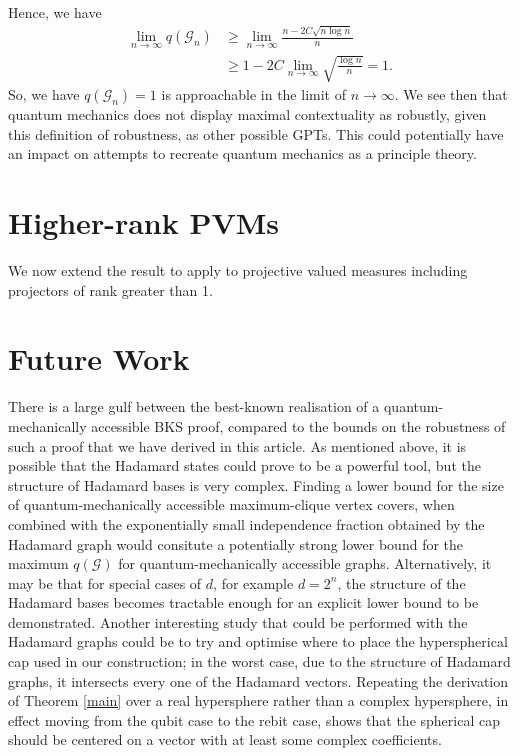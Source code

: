 \documentclass{amsart}
\theoremstyle{definition}
\begin{document}
Hence, we have
\begin{align}
\lim_{n\rightarrow\infty}q(\mathcal{G}_n)&\geq\lim_{n\rightarrow\infty}\frac{n-2C\sqrt{n\log n}}{n}\\
&\geq 1-2C\lim_{n\rightarrow\infty}\sqrt{\frac{\log n}{n}}=1.
\end{align}
So, we have $q(\mathcal{G}_n)=1$ is approachable in the limit of $n\rightarrow\infty$. We see then that quantum mechanics does not display maximal contextuality as robustly, given this definition of robustness, as other possible GPTs. This could potentially have an impact on attempts to recreate quantum mechanics as a principle theory.

\FloatBarrier

\section{Higher-rank PVMs}

We now extend the result to apply to projective valued measures including projectors of rank greater than 1.

\section{Future Work}
There is a large gulf between the best-known realisation of a quantum-mechanically accessible BKS proof, compared to the bounds on the robustness of such a proof that we have derived in this article. As mentioned above, it is possible that the Hadamard states could prove to be a powerful tool, but the structure of Hadamard bases is very complex. Finding a lower bound for the size of quantum-mechanically accessible maximum-clique vertex covers, when combined with the exponentially small independence fraction obtained by the Hadamard graph would consitute a potentially strong lower bound for the maximum $q(\mathcal{G})$ for quantum-mechanically accessible graphs. Alternatively, it may be that for special cases of $d$, for example $d=2^n$, the structure of the Hadamard bases becomes tractable enough for an explicit lower bound to be demonstrated. Another interesting study that could be performed with the Hadamard graphs could be to try and optimise where to place the hyperspherical cap used in our construction; in the worst case, due to the structure of Hadamard graphs, it intersects every one of the Hadamard vectors. Repeating the derivation of Theorem \ref{main} over a real hypersphere rather than a complex hypersphere, in effect moving from the qubit case to the rebit case, shows that the spherical cap should be centered on a vector with at least some complex coefficients.
 

{}

\end{document}
